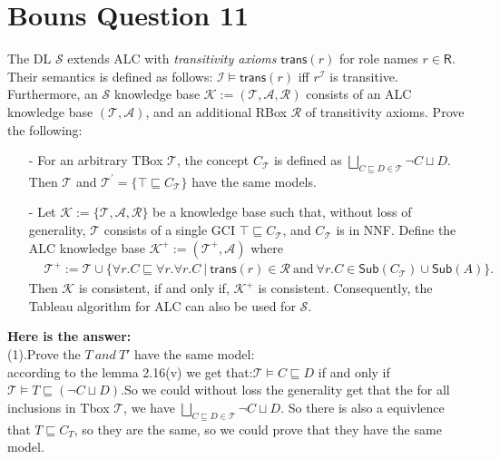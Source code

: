 \documentclass{article}
\begin{document}
    \section{Bouns Question 11}
    The DL $\mathcal{S}$ extends ALC with \emph{transitivity axioms} $\textsf{trans}(r)$ for role names $r\in\textsf{R}$. Their semantics is defined as follows: $\mathcal{I}\models\textsf{trans}(r)$ iff $r^{\mathcal{I}}$ is transitive. Furthermore, an $\mathcal{S}$ knowledge base $\mathcal{K}:=(\mathcal{T}, \mathcal{A}, \mathcal{R})$ consists of an ALC knowledge base $(\mathcal{T}, \mathcal{A})$, and an additional RBox $\mathcal{R}$ of transitivity axioms. Prove the following:
    \begin{itemize}
        \item[-] For an arbitrary TBox $\mathcal{T}$, the concept $C_{\mathcal{T}}$ is defined as $\underset{C\sqsubseteq D\in\mathcal{T}}{\bigsqcup}\neg C\sqcup D$. Then $\mathcal{T}$ and $\mathcal{T}^{\prime}=\{\top\sqsubseteq C_{\mathcal{T}}\}$ have the same models.
        \item[-] Let $\mathcal{K}:=\{\mathcal{T}, \mathcal{A}, \mathcal{R}\}$ be a knowledge base such that, without loss of generality, $\mathcal{T}$ consists of a single GCI $\top\sqsubseteq C_{\mathcal{T}}$, and $C_{\mathcal{T}}$ is in NNF. Define the ALC knowledge base $\mathcal{K}^{+}:=(\mathcal{T}^{+}, \mathcal{A})$ where
        \begin{align*}
            &\mathcal{T}^{+}:=\mathcal{T}\cup\{\forall r.C\sqsubseteq\forall r.\forall r.C~|~\textsf{trans}(r)\in\mathcal{R}~\text{and}~\forall r.C\in\textsf{Sub}(C_{\mathcal{T}})\cup \textsf{Sub}(A)\}.
        \end{align*}
        Then $\mathcal{K}$ is consistent, if and only if, $\mathcal{K}^{+}$ is consistent. Consequently, the Tableau algorithm for ALC can also be used for $\mathcal{S}$.
    \end{itemize}
    \textbf{Here is the answer:}\\
    (1).Prove the $T\ and\ T'$ have the same model:\\
    according to the lemma 2.16(v) we get that:$\mathcal{T}\models C \sqsubseteq D$ if and only if $\mathcal{T}\models T \sqsubseteq (\neg C \sqcup D)$.So we could without loss the generality get that
    the for all inclusions in Tbox $\mathcal{T}$, we have $\underset{C\sqsubseteq D\in\mathcal{T}}{\bigsqcup}\neg C\sqcup D$. So there is also a equivlence that $T \sqsubseteq C_T$, so they are the same, so we could prove that they have the same model.\\
    
\end{document}
